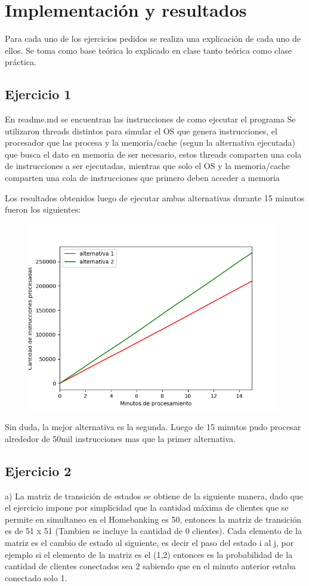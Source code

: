 \documentclass[11pt,a4paper]{article}
\begin{document}
\newpage


\section{Implementación y resultados}
Para cada uno de los ejercicios pedidos se realiza una explicación de cada uno de ellos. Se toma como base teórica lo explicado en clase tanto teórica como clase práctica.

	\subsection{Ejercicio 1}
	    En readme.md se encuentran las instrucciones de como ejecutar el programa
	    Se utilizaron threads distintos para simular el OS que genera instrucciones, el procesador que las procesa y la memoria/cache (segun la alternativa ejecutada) que busca el dato en memoria de ser necesario, estos threads comparten una cola de instrucciones a ser ejecutadas, mientras que solo el OS y la memoria/cache comparten una cola de instrucciones que primero deben acceder a memoria

	    Los resultados obtenidos luego de ejecutar ambas alternativas durante 15 minutos fueron los siguientes:

	    \begin{figure}[H]
  			\centering
    			\includegraphics[width=11cm]{imagenes/ejercicio1}
		\end{figure}

		Sin duda, la mejor alternativa es la segunda. Luego de 15 minutos pudo procesar alrededor de 50mil instrucciones mas que la primer alternativa.
	\subsection{Ejercicio 2}
		a) La matriz de transición de estados se obtiene de la siguiente manera, dado que el ejercicio impone por simplicidad que la   cantidad máxima de clientes que se permite en simultaneo en el Homebanking es 50, entonces la matriz de transición es de 51 x 51 (Tambien se incluye la cantidad de 0 clientes). Cada elemento de la matriz es el cambio de estado al siguiente, es decir el paso del estado i al j, por ejemplo si el elemento de la matriz es el (1,2) entonces es la probabilidad de la cantidad de clientes conectados sea 2 sabiendo que en el minuto anterior estaba conectado solo 1.
		
\end{document}

